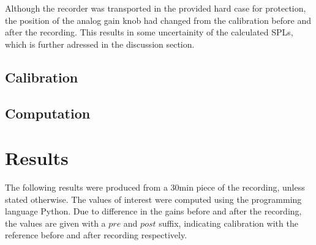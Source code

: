 \documentclass[twocolumn]{article}
\begin{document}
Although the recorder was transported in the provided hard case for protection, the position of the analog gain
knob had changed from the calibration before and after the recording.
This results in some uncertainity of the calculated SPLs, which is further adressed in the discussion
section.

\subsection{Calibration}

\subsection{Computation}

\section{Results}
The following results were produced from a $30\textrm{min}$ piece of the recording, unless stated otherwise.
The values of interest were computed using the programming language Python.
Due to difference in the gains before and after the recording, the values are given with a $pre$ and $post$ suffix,
indicating calibration with the reference before and after recording respectively.
\end{document}
